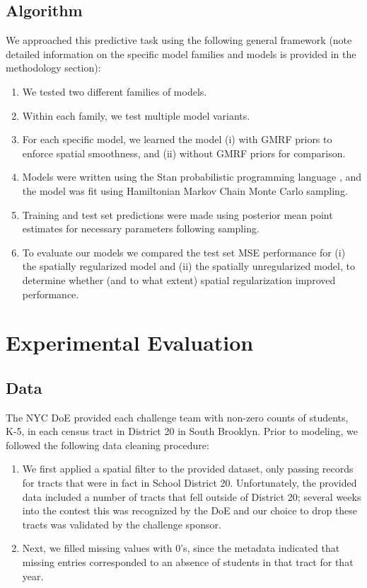 \documentclass[journal]{IEEEtran}
\begin{document}
\subsection{Algorithm}

We approached this predictive task using the following general framework (note detailed information on the specific model families and models is provided in the methodology section):
\begin{enumerate}
    \item We tested two different families of models.
    \item Within each family, we test multiple model variants.
    \item For each specific model, we learned the model (i) with GMRF priors to enforce spatial smoothness, and (ii) without GMRF priors for comparison.
    \item Models were written using the Stan probabilistic programming language \cite{carpenter2016stan}, and the model was fit using  Hamiltonian Markov Chain Monte Carlo sampling.
    \item Training and test set predictions were made using posterior mean point estimates for necessary parameters following sampling.
    \item To evaluate our models we compared the test set MSE performance for (i) the spatially regularized model and (ii) the spatially unregularized model, to determine whether (and to what extent) spatial regularization improved performance.
\end{enumerate}

\section{Experimental Evaluation}
\subsection{Data}

The NYC DoE provided each challenge team with non-zero counts of students, K-5, in each census tract in District 20 in South Brooklyn. Prior to modeling, we followed the following data cleaning procedure:
\begin{enumerate}
    \item We first applied a spatial filter to the provided dataset, only passing records for tracts that were in fact in School District 20. Unfortunately, the provided data included a number of tracts that fell outside of District 20; several weeks into the contest this  was recognized by the DoE and our choice to drop these tracts was validated by the challenge sponsor.
    \item Next, we filled missing values with 0's, since the metadata indicated that missing entries corresponded to an absence of students in that tract for that year.
\end{enumerate}
\end{document}
